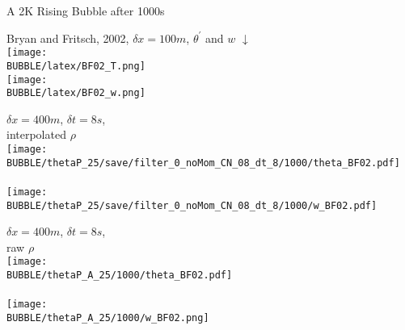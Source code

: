\begin{slide}
{
    A 2K Rising Bubble after 1000s
}

\renewcommand{\figWidth}{0.32\linewidth}

\begin{minipage}[t]{\figWidth}\centering
Bryan and Fritsch, 2002, $\delta x = 100m$, $\theta^\prime$ and $w$ $\downarrow$
\\
\texttt{[image: \\BUBBLE/latex/BF02\_T.png]} \\
\texttt{[image: \\BUBBLE/latex/BF02\_w.png]} \\
\end{minipage}
%
\begin{minipage}[t]{\figWidth}\centering
$\delta x = 400m$, $\delta t = 8s$, \\interpolated $\rho$ \\
\texttt{[image: \\BUBBLE/thetaP\_25/save/filter\_0\_noMom\_CN\_08\_dt\_8/1000/theta\_BF02.pdf]}
\\ \ \\
\texttt{[image: \\BUBBLE/thetaP\_25/save/filter\_0\_noMom\_CN\_08\_dt\_8/1000/w\_BF02.pdf]}
\end{minipage}
%
\begin{minipage}[t]{\figWidth}\centering
$\delta x = 400m$, $\delta t = 8s$, \\raw $\rho$ \\
\texttt{[image: \\BUBBLE/thetaP\_A\_25/1000/theta\_BF02.pdf]}
\\ \ \\
\texttt{[image: \\BUBBLE/thetaP\_A\_25/1000/w\_BF02.png]}
\end{minipage}

\end{slide}
